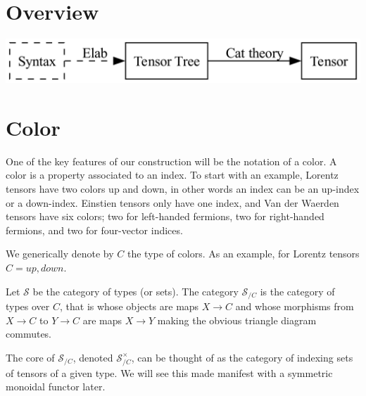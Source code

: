 \documentclass[a4paper, 11pt]{article}
\begin{document}
\section{Overview}
\includegraphics[width=\textwidth]{overviewFlow.png}


\section{Color}

One of the key features of our construction will be the notation of a color. 
A color is a property associated to an index.  
To start with an example, Lorentz tensors have two colors up and down, in other words an 
index can be an up-index or a down-index. Einstien tensors only have one index, and 
Van der Waerden tensors have six colors; two for left-handed fermions, two for right-handed 
fermions, and two for four-vector indices. 

We generically denote by $C$ the type of colors. As an example, for
Lorentz tensors $C = {up, down}$. 

Let $\mathcal{S}$ be the category of types (or sets). The category $\mathcal{S}_{/C}$ is the 
category 
of types over $C$, that is whose objects are maps $X\to C$ and whose morphisms from 
$X\to C$ to $Y\to C$ are maps $X\to Y$ making the obvious triangle diagram commutes. 

The core of $\mathcal{S}_{/C}$, denoted $\mathcal{S}_{/C}^\times$, can be thought of as the 
category of indexing sets of tensors of a given type. We will see this made manifest with 
a symmetric monoidal functor later.





\begin{spacing}{0.5}

\end{spacing}


\end{document}
